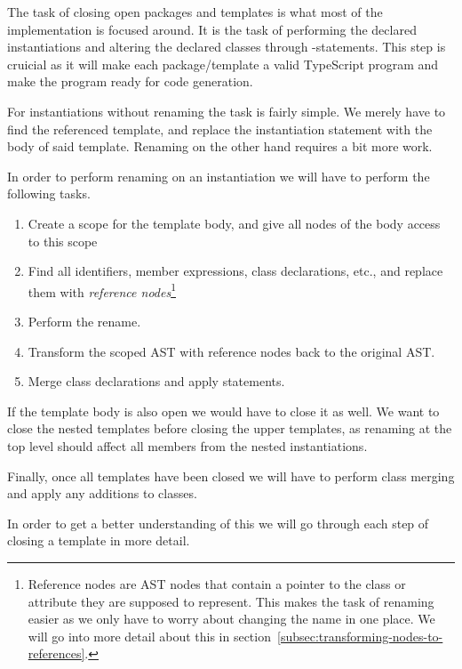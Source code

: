 The task of closing open packages and templates is what most of the implementation is focused around.
It is the task of performing the declared instantiations and altering the declared classes through -statements.
This step is cruicial as it will make each package/template a valid TypeScript program and make the program ready for code generation.

For instantiations without renaming the task is fairly simple.
We merely have to find the referenced template, and replace the instantiation statement with the body of said template.
Renaming on the other hand requires a bit more work.

In order to perform renaming on an instantiation we will have to perform the following tasks.
\begin{enumerate}
    \item Create a scope for the template body, and give all nodes of the body access to this scope
    \item Find all identifiers, member expressions, class declarations, etc., and replace them with \textit{reference nodes}\footnote{Reference nodes are AST nodes that contain a pointer to the class or attribute they are supposed to represent. This makes the task of renaming easier as we only have to worry about changing the name in one place. We will go into more detail about this in section~\vref{subsec:transforming-nodes-to-references}.}
    \item Perform the rename.
    \item Transform the scoped AST with reference nodes back to the original AST\@.
    \item Merge class declarations and apply  statements.
\end{enumerate}

If the template body is also open we would have to close it as well.
We want to close the nested templates before closing the upper templates, as renaming at the top level should affect all members from the nested instantiations.

Finally, once all templates have been closed we will have to perform class merging and apply any additions to classes.

In order to get a better understanding of this we will go through each step of closing a template in more detail.

